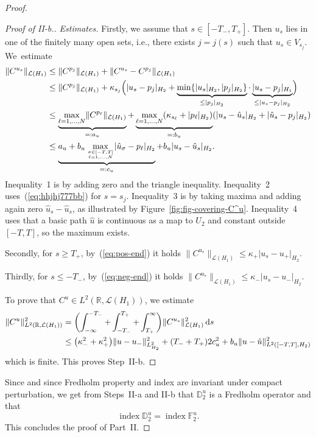 \documentclass[pdftex]{sigma}
\numberwithin{equation}{section}
\newcommand{\D}{{\mathbb{D}}}
\newcommand{\F}{{\mathbb{F}}}
\newcommand{\R}{{\mathbb{R}}}
\newcommand{\Ll}{{\mathcal{L}}} %
\newcommand{\INDEX}{\mathop{\mathrm{index}}} %
\newcommand{\norm}{{\rm norm}}
\def\abs#1{\mathopen|#1\mathclose|}
\def\norm#1{\mathopen\|#1\mathclose\|}
\newcommand{\1}{{{\mathchoice {\rm 1\mskip-4mu l} {\rm 1\mskip-4mu l}
{\rm 1\mskip-4.5mu l} {\rm 1\mskip-5mu l}}}}
\begin{document}
\begin{proof}
\begin{proof}[Proof of II-b.]
\textit{Estimates.}
Firstly, we assume that $s\in[-T_-,T_+]$.
Then $u_s$ lies in one of the finitely many
open sets, i.e., there exists $j=j(s)$ such that
$u_s\in V_{s_j}$. We~estimate
\begin{equation*}
\begin{split}
 \norm{C^{u_s}}_{\Ll(H_1)}
 &\le \norm{C^{p_j}}_{\Ll(H_1)}+\norm{C^{u_s}-C^{p_j}}_{\Ll(H_1)}
\\
 &\le \norm{C^{p_j}}_{\Ll(H_1)}
 +\kappa_{s_j}
 \Bigl(\abs{u_s-p_{j}}_{H_2}
 +\underbrace{\min\{\abs{u_s}_{H_2},\abs{p_{j}}_{H_2}\}}_{\le \abs{p_{j}}_{H_2}}
 \cdot \underbrace{\abs{u_s-p_{j}}_{H_1}}_{\le \abs{u_s-p_{j}}_{H_2}}\Bigr)
\\
 &\le\underbrace{\max_{\ell=1,\dots,N}\norm{C^{p_\ell}}_{\Ll(H_1)}}_{=:a_u}
 +\underbrace{\max_{\ell=1,\dots,N}
 (\kappa_{s_\ell}+\abs{p_{\ell}}_{H_2} )}_{=:b_u}
 (\abs{u_s-\hat u_s}_{H_2}+\abs{\hat u_s-p_{j}}_{H_2} )
\\
 &\le
 \underbrace{a_u+b_u \max_{\sigma\in[-T,T]\atop \ell=1,\dots,N}
 \abs{\hat u_\sigma-p_{\ell}}_{H_2}}_{=:c_u}
 +b_u \abs{u_s-\hat u_s}_{H_2} .
\end{split}
\end{equation*}
Inequality~1 is by adding zero and the triangle inequality.
Inequality~2 uses~(\ref{eq:hhjhj777bb}) for $s=s_j$.
Inequality~3 is by taking maxima and adding again zero
$\hat u_s-\hat u_s$, as illustrated by
Figure~\ref{fig:fig-covering-C^u}.
Inequality~4 uses that a basic path $\hat u$ is continuous as a map to
$U_2$ and constant outside $[-T,T]$, so the maximum exists.


Secondly, for $s\ge T_+$, by~(\ref{eq:pos-end}) it holds
$ \norm{C^{u_s}}_{\Ll(H_1)}
 \le\kappa_+\abs{u_s-u_+}_{H_2}$.


Thirdly, for $s\le -T_-$, by~(\ref{eq:neg-end}) it holds
$ \norm{C^{u_s}}_{\Ll(H_1)}
 \le\kappa_-\abs{u_s-u_-}_{H_2}$.


To prove that $C^u\in L^2(\R,\Ll(H_1))$, we estimate
\begin{equation*}
\begin{split}
 \norm{C^u}_{L^2(\R,\Ll(H_1))}^2
 &=\biggl(\int_{-\infty}^{-T_-} +\int_{-T_-}^{T_+} +\int_{T_+}^\infty\biggr)
 \norm{C^{u_s}}_{\Ll(H_1)}^2 \, {\rm d}s
\\
 &\le\bigl(\kappa_-^2 +\kappa_+^2\bigr)\norm{u-u_-}_{L^2_{H_2}}^2
 +(T_-+T_+) 2 c_u^2+b_u\norm{u-\hat u}_{L^2([-T,T],H_2)}^2
\end{split}
\end{equation*}
which is finite.
This proves Step~II-b.
\end{proof}


Since \smash{$\D^u_2=\F^u_2+M^{C^u}_2$} and since Fredholm
property and index are invariant under compact perturbation, we get
from Steps~II-a and II-b that $\D^u_2$ is a Fredholm operator and that
\begin{equation*}%
 \INDEX \D^u_2=\INDEX \F^u_2 .
\end{equation*}
This concludes the proof of Part~II.
\end{proof}
\end{document}
